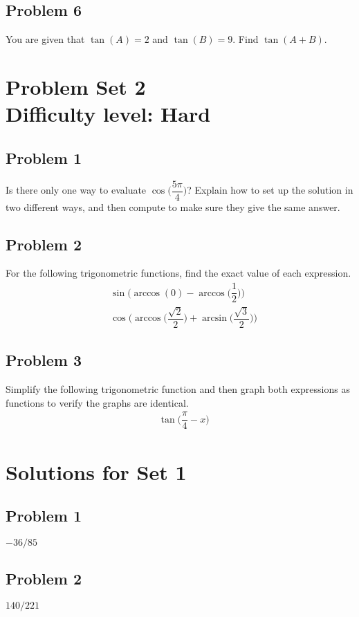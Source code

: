 \documentclass[12pt]{article}
\begin{document}
\subsection*{Problem 6}
You are given that \(\tan(A)=2\) and \(\tan(B)=9\). Find \(\tan(A+B)\).

\section*{Problem Set 2\\Difficulty level: Hard}

\subsection*{Problem 1}
Is there only one way to evaluate \(\cos\Big(\dfrac{5\pi}{4}\Big)\)? Explain how to set up the solution in two different ways, and then compute to make sure they give the same answer.

\subsection*{Problem 2}
For the following trigonometric functions, find the exact value of each expression.
\begin{align*}
    &\sin\Big(\arccos(0)-\arccos\Big(\dfrac{1}{2}\Big)\Big)\\
    &\cos\Big(\arccos\Big(\dfrac{\sqrt{2}}{2}\Big)+\arcsin\Big(\dfrac{\sqrt{3}}{2}\Big)\Big)
\end{align*}

\subsection*{Problem 3}
Simplify the following trigonometric function and then graph both expressions as functions to verify the graphs are identical.
\begin{align*}
    &\tan\Big(\dfrac{\pi}{4}-x\Big)
\end{align*}


\newpage
\section*{Solutions for Set 1}
\subsection*{Problem 1}
\(-36/85\)
\subsection*{Problem 2}
\(140/221\)
\end{document}
